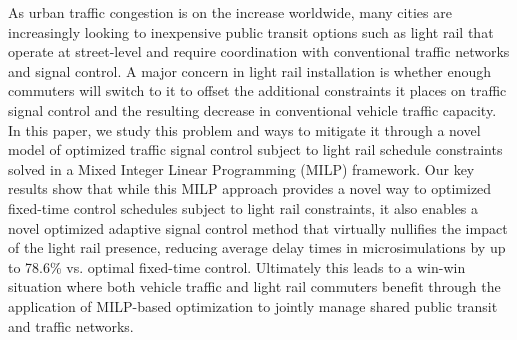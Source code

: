 As urban traffic congestion is on the increase worldwide, many cities
are increasingly looking to inexpensive public transit options such as
light rail that operate at street-level and require coordination with
conventional traffic networks and signal control. A major concern in
light rail installation is whether enough commuters will switch to it
to offset the additional constraints it places on traffic signal
control and the resulting decrease in conventional vehicle traffic
capacity. In this paper, we study this problem and ways to mitigate it
through a novel model of optimized traffic signal control subject to
light rail schedule constraints solved in a Mixed Integer Linear
Programming (MILP) framework. Our key results show that while this
MILP approach provides a novel way to optimized fixed-time control
schedules subject to light rail constraints, it also enables a
novel optimized adaptive signal control method that virtually
nullifies the impact of the light rail presence, 
reducing average delay times in microsimulations by up to 78.6\%
vs. optimal fixed-time control.  Ultimately this leads to a win-win
situation where both vehicle traffic and light rail
commuters benefit through the application of MILP-based optimization
to jointly manage shared public transit and traffic networks.

